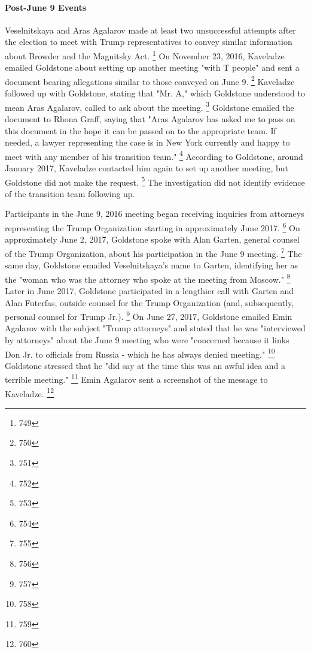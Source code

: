 \paragraph{Post-June 9 Events}

Veselnitskaya and Aras Agalarov made at least two unsuccessful attempts after the election to meet with Trump representatives to convey similar information about Browder and the Magnitsky Act.%
\footnote{749}
On November 23, 2016, Kaveladze emailed Goldstone about setting up another meeting "with T people" and sent a document bearing allegations similar to those conveyed on June 9.%
\footnote{750}
Kaveladze followed up with Goldstone, stating that "Mr. A," which Goldstone understood to mean Aras Agalarov, called to ask about the meeting.%
\footnote{751}
Goldstone emailed the document to Rhona Graff, saying that "Aras Agalarov has asked me to pass on this document in the hope it can be passed on to the appropriate team.
If needed, a lawyer representing the case is in New York currently and happy to meet with any member of his transition team."%
\footnote{752}
According to Goldstone, around January 2017, Kaveladze contacted him again to set up another meeting, but Goldstone did not make the request.%
\footnote{753}
The investigation did not identify evidence of the transition team following up.

Participants in the June 9, 2016 meeting began receiving inquiries from attorneys representing the Trump Organization starting in approximately June 2017.%
\footnote{754}
On approximately June 2, 2017, Goldstone spoke with Alan Garten, general counsel of the Trump Organization, about his participation in the June 9 meeting.%
\footnote{755}
The same day, Goldstone emailed Veselnitskaya's name to Garten, identifying her as the "woman who was the attorney who spoke at the meeting from Moscow."%
\footnote{756}
Later in June 2017, Goldstone participated in a lengthier call with Garten and Alan Futerfas, outside counsel for the Trump Organization (and, subsequently, personal counsel for Trump Jr.).%
\footnote{757}
On June 27, 2017, Goldstone emailed Emin Agalarov with the subject "Trump attorneys" and stated that he was "interviewed by attorneys" about the June 9 meeting who were "concerned because it links Don Jr. to officials from Russia - which he has always denied meeting."%
\footnote{758}
Goldstone stressed that he "did say at the time this was an awful idea and a terrible meeting."%
\footnote{759}
Emin Agalarov sent a screenshot of the message to Kaveladze.%
\footnote{760}

